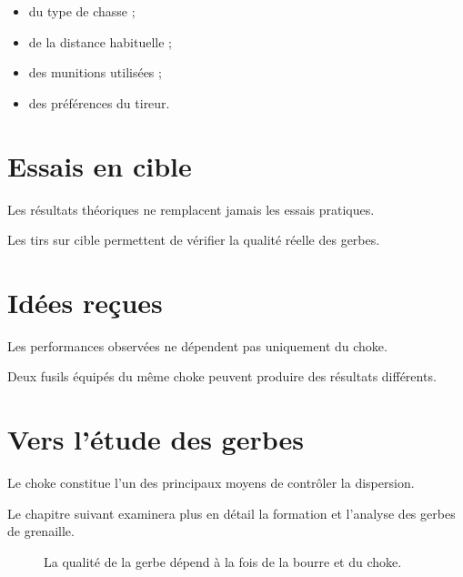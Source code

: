 \begin{itemize}
    \item du type de chasse ;
    \item de la distance habituelle ;
    \item des munitions utilisées ;
    \item des préférences du tireur.
\end{itemize}

\section{Essais en cible}

Les résultats théoriques ne remplacent jamais les essais pratiques.

Les tirs sur cible permettent de vérifier la qualité réelle des gerbes.

\section{Idées reçues}

Les performances observées ne dépendent pas uniquement du choke.

Deux fusils équipés du même choke peuvent produire des résultats différents.

\section{Vers l'étude des gerbes}

Le choke constitue l'un des principaux moyens de contrôler la dispersion.

Le chapitre suivant examinera plus en détail la formation et l'analyse des
gerbes de grenaille.

\begin{figure}[htbp]
\centering


\caption{La qualité de la gerbe dépend à la fois de la bourre et du choke.}
\label{fig:bourre_choke}

\end{figure}

